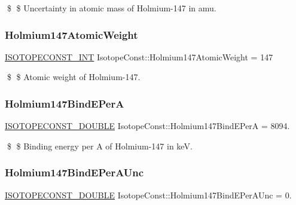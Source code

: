 \$ \$ Uncertainty in atomic mass of Holmium-\/147 in amu. \mbox{\label{group___isotope_const-_holmium-_ho147_ga3e50f5b40fea5463800a80c051cf5996}} 
\subsubsection{\texorpdfstring{Holmium147\+Atomic\+Weight}{Holmium147AtomicWeight}}
{\footnotesize\ttfamily \mbox{\hyperlink{group___isotope_const-_macros_ga5f18360b3e99483a35c32d789e62621c}{I\+S\+O\+T\+O\+P\+E\+C\+O\+N\+S\+T\+\_\+\+I\+NT}} Isotope\+Const\+::\+Holmium147\+Atomic\+Weight = 147}

\$ \$ Atomic weight of Holmium-\/147. \mbox{\label{group___isotope_const-_holmium-_ho147_gac5e9944c917d30280b979589b6e78aec}} 
\subsubsection{\texorpdfstring{Holmium147\+Bind\+E\+PerA}{Holmium147BindEPerA}}
{\footnotesize\ttfamily \mbox{\hyperlink{group___isotope_const-_macros_ga8f45a7272ce02c0b4c65c44636ed719a}{I\+S\+O\+T\+O\+P\+E\+C\+O\+N\+S\+T\+\_\+\+D\+O\+U\+B\+LE}} Isotope\+Const\+::\+Holmium147\+Bind\+E\+PerA = 8094.}

\$ \$ Binding energy per A of Holmium-\/147 in keV. \mbox{\label{group___isotope_const-_holmium-_ho147_ga907e1fd35b495ef08fce44eaa6b60a1e}} 
\subsubsection{\texorpdfstring{Holmium147\+Bind\+E\+Per\+A\+Unc}{Holmium147BindEPerAUnc}}
{\footnotesize\ttfamily \mbox{\hyperlink{group___isotope_const-_macros_ga8f45a7272ce02c0b4c65c44636ed719a}{I\+S\+O\+T\+O\+P\+E\+C\+O\+N\+S\+T\+\_\+\+D\+O\+U\+B\+LE}} Isotope\+Const\+::\+Holmium147\+Bind\+E\+Per\+A\+Unc = 0.}

